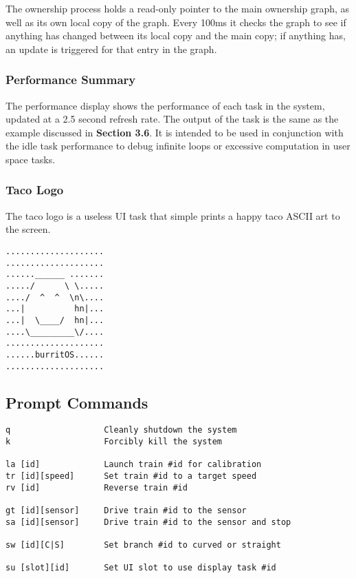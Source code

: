 \documentclass[twoside,a4paper]{refart}
\begin{document}
The ownership process holds a read-only pointer to the main ownership graph, as well as its own local copy of the graph. Every 100ms it checks the graph to see if anything has changed between its local copy and the main copy; if anything has, an update is triggered for that entry in the graph.

\subsubsection{Performance Summary}

The performance display shows the performance of each task in the system, updated at a 2.5 second refresh rate. The output of the task is the same as the example discussed in \textbf{Section 3.6}. It is intended to be used in conjunction with the idle task performance to debug infinite loops or excessive computation in user space tasks.

\subsubsection{Taco Logo}

The taco logo is a useless UI task that simple prints a happy taco ASCII art to the screen.

\begin{verbatim}
....................
....................
......______ .......
...../      \ \.....
..../  ^  ^  \n\....
...|          hn|...
...|  \____/  hn|...
....\_________\/....
....................
......burritOS......
....................
\end{verbatim}

\subsection{Prompt Commands}
\begin{verbatim}
q                   Cleanly shutdown the system
k                   Forcibly kill the system

la [id]             Launch train #id for calibration
tr [id][speed]      Set train #id to a target speed
rv [id]             Reverse train #id

gt [id][sensor]     Drive train #id to the sensor
sa [id][sensor]     Drive train #id to the sensor and stop

sw [id][C|S]        Set branch #id to curved or straight

su [slot][id]       Set UI slot to use display task #id
\end{verbatim}
\end{document}
